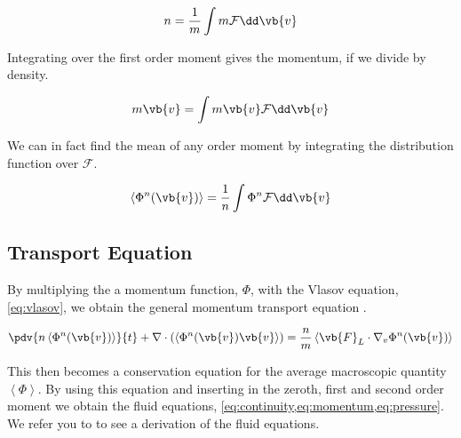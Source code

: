 	\begin{equation}
			n = \frac{1}{m}\int m \mathcal{F} \dd\vb{v}
	\end{equation}

	Integrating over the first order moment gives the momentum, if we divide
	by density.

	\begin{equation}
			m\vb{v} = \int m \vb{v} \mathcal{F} \dd\vb{v}
	\end{equation}

	We can in fact find the mean of any order moment by integrating the
	distribution function over \(\mathcal{F}\).

	\begin{equation}
		\left< \Phi^n(\vb{v}) \right> = \frac{1}{n} \int \Phi^n \mathcal{F} \dd\vb{v}
	\end{equation}

\subsection{Transport Equation}
	By multiplying the a momentum function, \( \Phi \), with the Vlasov equation, \cref{eq:vlasov},
	we obtain the general momentum transport equation \citep{shu_physics_2010}.

	\begin{equation}
		\pdv{n\left< \Phi^n(\vb{v}) \right>}{t} + \nabla \cdot \left( \left< \Phi^n(\vb{v})\vb{v} \right> \right)
		= \frac{n}{m} \left< \vb{F}_L \cdot \nabla_v \Phi^n(\vb{v}) \right>
	\end{equation}

	This then becomes a conservation equation for the average macroscopic quantity
	\(\left< \Phi \right>\). By using this equation and inserting in the zeroth, first and second order
	moment we obtain the fluid equations, \cref{eq:continuity,eq:momentum,eq:pressure}.
	We refer you to \citet{fitzpatrick_plasma_2014} to see a derivation of the fluid
	equations.




